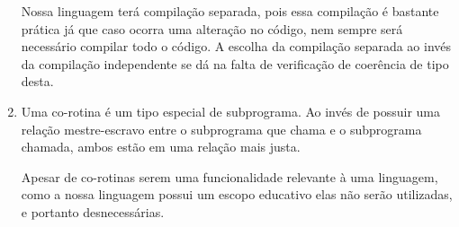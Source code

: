 \documentclass[12pt, a4paper]{article}
\begin{document}
\begin{enumerate}
        Nossa linguagem terá compilação separada, pois essa compilação é
        bastante prática já que caso ocorra uma alteração no código, nem sempre
        será necessário compilar todo o código. A escolha da compilação
        separada ao invés da compilação independente se dá na falta de
        verificação de coerência de tipo desta.

        \item
        Uma co-rotina é um tipo especial de subprograma. Ao invés de possuir
        uma relação mestre-escravo entre o subprograma que chama e o
        subprograma chamada, ambos estão em uma relação mais justa.

        Apesar de co-rotinas serem uma funcionalidade relevante à uma
        linguagem, como a nossa linguagem possui um escopo educativo elas não
        serão utilizadas, e portanto desnecessárias.

    \end{enumerate}
\end{document}
